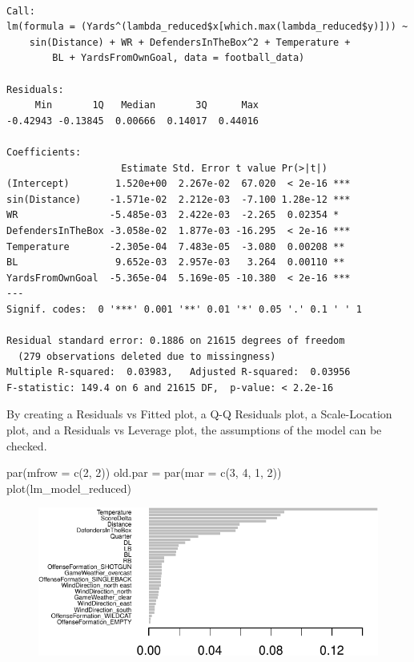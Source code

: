 \documentclass[
  super,
  preprint,
  3p]{elsarticle}
\newenvironment{Shaded}{\begin{snugshade}}{\end{snugshade}}
\newcommand{\AttributeTok}[1]{\textcolor[rgb]{0.40,0.45,0.13}{#1}}
\newcommand{\DecValTok}[1]{\textcolor[rgb]{0.68,0.00,0.00}{#1}}
\newcommand{\FunctionTok}[1]{\textcolor[rgb]{0.28,0.35,0.67}{#1}}
\newcommand{\NormalTok}[1]{\textcolor[rgb]{0.00,0.23,0.31}{#1}}
\newcommand{\OtherTok}[1]{\textcolor[rgb]{0.00,0.23,0.31}{#1}}
\begin{document}
\begin{verbatim}

Call:
lm(formula = (Yards^(lambda_reduced$x[which.max(lambda_reduced$y)])) ~ 
    sin(Distance) + WR + DefendersInTheBox^2 + Temperature + 
        BL + YardsFromOwnGoal, data = football_data)

Residuals:
     Min       1Q   Median       3Q      Max 
-0.42943 -0.13845  0.00666  0.14017  0.44016 

Coefficients:
                    Estimate Std. Error t value Pr(>|t|)    
(Intercept)        1.520e+00  2.267e-02  67.020  < 2e-16 ***
sin(Distance)     -1.571e-02  2.212e-03  -7.100 1.28e-12 ***
WR                -5.485e-03  2.422e-03  -2.265  0.02354 *  
DefendersInTheBox -3.058e-02  1.877e-03 -16.295  < 2e-16 ***
Temperature       -2.305e-04  7.483e-05  -3.080  0.00208 ** 
BL                 9.652e-03  2.957e-03   3.264  0.00110 ** 
YardsFromOwnGoal  -5.365e-04  5.169e-05 -10.380  < 2e-16 ***
---
Signif. codes:  0 '***' 0.001 '**' 0.01 '*' 0.05 '.' 0.1 ' ' 1

Residual standard error: 0.1886 on 21615 degrees of freedom
  (279 observations deleted due to missingness)
Multiple R-squared:  0.03983,   Adjusted R-squared:  0.03956 
F-statistic: 149.4 on 6 and 21615 DF,  p-value: < 2.2e-16
\end{verbatim}

By creating a Residuals vs Fitted plot, a Q-Q Residuals plot, a
Scale-Location plot, and a Residuals vs Leverage plot, the assumptions
of the model can be checked.

\begin{Shaded}
\begin{Highlighting}[]
\FunctionTok{par}\NormalTok{(}\AttributeTok{mfrow =} \FunctionTok{c}\NormalTok{(}\DecValTok{2}\NormalTok{, }\DecValTok{2}\NormalTok{))}
\NormalTok{old.par }\OtherTok{=} \FunctionTok{par}\NormalTok{(}\AttributeTok{mar =} \FunctionTok{c}\NormalTok{(}\DecValTok{3}\NormalTok{, }\DecValTok{4}\NormalTok{, }\DecValTok{1}\NormalTok{, }\DecValTok{2}\NormalTok{))}
\FunctionTok{plot}\NormalTok{(lm\_model\_reduced)}
\end{Highlighting}
\end{Shaded}

\begin{figure}[H]

{\centering \includegraphics{project_report_files/figure-pdf/unnamed-chunk-20-1.pdf}

}

\end{figure}
\end{document}

